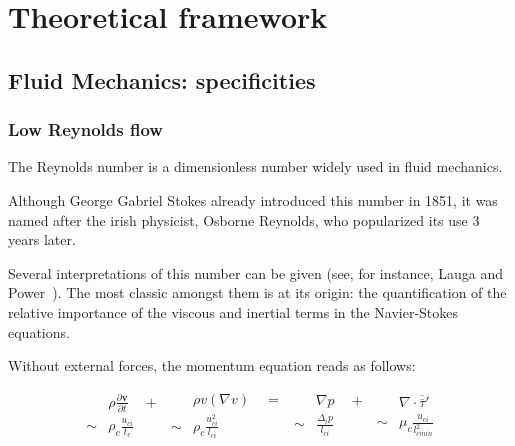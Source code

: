 \chapter{Theoretical framework}

\section{Fluid Mechanics: specificities}
\label{fluid_mechanics}

\subsection{Low Reynolds flow}

The Reynolds number is a dimensionless number widely used in fluid mechanics.

Although George Gabriel Stokes already introduced this number in 1851, it was named after the irish physicist, Osborne Reynolds, who popularized its use 3 years later.

Several interpretations of this number can be given (see, for instance, Lauga and Power~\cite{Lauga}). The most classic amongst them is at its origin: the quantification of the relative importance of the viscous and inertial terms in the Navier-Stokes equations.

Without external forces, the momentum equation reads as follows:

\begin{equation}
\begin{aligned}
& \rho \frac{\partial \mathbf{v}}{\partial t} \quad + \\
\sim & \rho_c \frac{u_{ci}}{t_c} 
\end{aligned}
\begin{aligned}
& \rho v (\nabla v) \quad = \\
\sim & \rho_c \frac{u_{ci}^2}{l_{ci}}
\end{aligned}
\begin{aligned}
& \nabla p \quad + \\
\sim & \frac{\Delta_i p}{l_{ci}}
\end{aligned}
\begin{aligned}
& \nabla \cdot \overline{\overline\tau}' \\
\sim & \mu_c \frac{u_{ci}}{l_{cmin}^2}
\end{aligned}
\label{CDM}
\end{equation}

